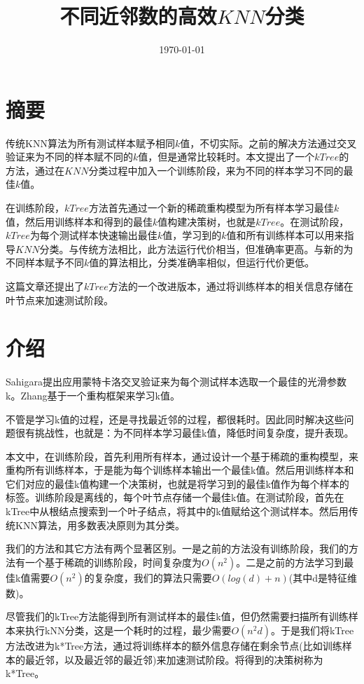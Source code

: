 \documentclass{ctexart}
\title{不同近邻数的高效$ KNN $分类}
\date{\today}
\begin{document}
	\maketitle
	\section{摘要}
	传统KNN算法为所有测试样本赋予相同$ k $值，不切实际。之前的解决方法通过交叉验证来为不同的样本赋不同的$ k $值，但是通常比较耗时。本文提出了一个$ kTree $的方法，通过在$ KNN $分类过程中加入一个训练阶段，来为不同的样本学习不同的最佳$ k $值。
	
	在训练阶段，$ kTree $方法首先通过一个新的稀疏重构模型为所有样本学习最佳$ k $值，然后用训练样本和得到的最佳$ k $值构建决策树，也就是$ kTree $。在测试阶段，$ kTree $为每个测试样本快速输出最佳$ k $值，学习到的$ k $值和所有训练样本可以用来指导$ KNN $分类。与传统方法相比，此方法运行代价相当，但准确率更高。与新的为不同样本赋予不同$ k $值的算法相比，分类准确率相似，但运行代价更低。
	
	这篇文章还提出了$ kTree $方法的一个改进版本，通过将训练样本的相关信息存储在叶节点来加速测试阶段。
	\section{介绍}
	Sahigara提出应用蒙特卡洛交叉验证来为每个测试样本选取一个最佳的光滑参数k。Zhang基于一个重构框架来学习k值。
	
	不管是学习k值的过程，还是寻找最近邻的过程，都很耗时。因此同时解决这些问题很有挑战性，也就是：为不同样本学习最佳k值，降低时间复杂度，提升表现。
	
	本文中，在训练阶段，首先利用所有样本，通过设计一个基于稀疏的重构模型，来重构所有训练样本，于是能为每个训练样本输出一个最佳k值。然后用训练样本和它们对应的最佳k值构建一个决策树，也就是将学习到的最佳k值作为每个样本的标签。训练阶段是离线的，每个叶节点存储一个最佳k值。在测试阶段，首先在kTree中从根结点搜索到一个叶子结点，将其中的k值赋给这个测试样本。然后用传统KNN算法，用多数表决原则为其分类。
	
	我们的方法和其它方法有两个显著区别。一是之前的方法没有训练阶段，我们的方法有一个基于稀疏的训练阶段，时间复杂度为$ O(n^2) $。二是之前的方法学习到最佳k值需要$ O(n^2) $的复杂度，我们的算法只需要$ O(log(d)+n) $(其中d是特征维数)。
	
	尽管我们的kTree方法能得到所有测试样本的最佳k值，但仍然需要扫描所有训练样本来执行kNN分类，这是一个耗时的过程，最少需要$ O(n^2d) $。于是我们将kTree方法改进为k*Tree方法，通过将训练样本的额外信息存储在剩余节点(比如训练样本的最近邻，以及最近邻的最近邻)来加速测试阶段。将得到的决策树称为k*Tree。
	
\end{document}
